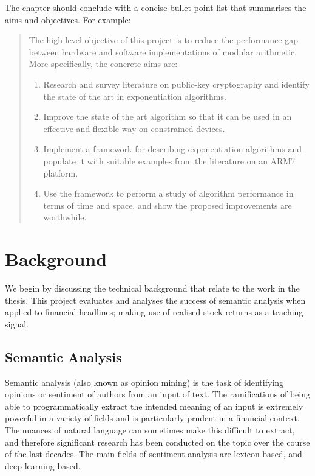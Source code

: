 \documentclass[ oneside,%
                    author={Joshua Felmeden},
                    degree={MEng},
                     title={Semantic Analysis of Financial Headlines Based on Realised Stock Returns},
                  subtitle={}]{dissertation}
\begin{document}
The chapter should conclude with a concise bullet point list that summarises the aims and objectives.  For example:

\begin{quote}
\noindent
The high-level objective of this project is to reduce the performance 
gap between hardware and software implementations of modular arithmetic.  
More specifically, the concrete aims are:

\begin{enumerate}
\item Research and survey literature on public-key cryptography and
      identify the state of the art in exponentiation algorithms.
\item Improve the state of the art algorithm so that it can be used
      in an effective and flexible way on constrained devices.
\item Implement a framework for describing exponentiation algorithms
      and populate it with suitable examples from the literature on 
      an ARM7 platform.
\item Use the framework to perform a study of algorithm performance
      in terms of time and space, and show the proposed improvements
      are worthwhile.
\end{enumerate}
\end{quote}


\chapter{Background}
\label{chap:technical}

We begin by discussing the technical background that relate to the work in the thesis. This project evaluates and analyses the success of semantic analysis when applied to financial headlines; making use of realised stock returns as a teaching signal.

\section{Semantic Analysis}
Semantic analysis (also known as opinion mining) is the task of identifying opinions or sentiment of authors from an input of text. The ramifications of being able to programmatically extract the intended meaning of an input is extremely powerful in a variety of fields and is particularly prudent in a financial context. The nuances of natural language can sometimes make this difficult to extract, and therefore significant research has been conducted on the topic over the course of the last decades. The main fields of sentiment analysis are lexicon based, and deep learning based.
\end{document}
